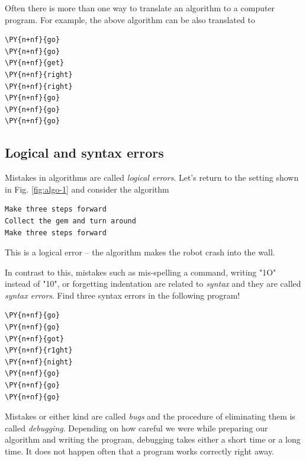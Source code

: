 \noindent
Often there is more than one way to translate an algorithm to a computer 
program. For example, the above algorithm can be also translated to\\

\begin{bbox}
\begin{Verbatim}[commandchars=\\\{\}]
\PY{n+nf}{go}
\PY{n+nf}{go}
\PY{n+nf}{get}
\PY{n+nf}{right}
\PY{n+nf}{right}
\PY{n+nf}{go}
\PY{n+nf}{go}
\PY{n+nf}{go}
\end{Verbatim}
\end{bbox}
\vspace{6mm}

\subsection{Logical and syntax errors}

Mistakes in algorithms are called {\em logical errors}. Let's return to 
the setting shown in Fig. \ref{fig:algo-1} and consider the algorithm

\begin{verbatim}
Make three steps forward
Collect the gem and turn around
Make three steps forward
\end{verbatim}
This is a logical error -- the algorithm makes the robot crash into the wall.

In contrast to this, mistakes such as mis-spelling a command, writing "1O" instead of "10", or forgetting 
indentation are related to {\em syntax} and they are called {\em syntax errors}. Find
three syntax errors in the following program!\\

\begin{bbox}
\begin{Verbatim}[commandchars=\\\{\}]
\PY{n+nf}{go}
\PY{n+nf}{go}
\PY{n+nf}{got}
\PY{n+nf}{r1ght}
\PY{n+nf}{night}
\PY{n+nf}{go}
\PY{n+nf}{go}
\PY{n+nf}{go}
\end{Verbatim}
\end{bbox}
\vspace{6mm}

\noindent
Mistakes or either kind are called {\em bugs} and the procedure of 
eliminating them is called {\em debugging}. Depending on how careful we 
were while preparing our algorithm and writing the program, debugging takes either 
a short time or a long time. It does not happen often that a program works correctly
right away. \\

